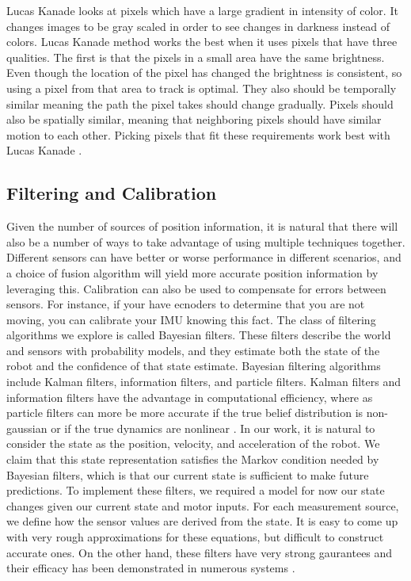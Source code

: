 \documentclass{article}
\begin{document}
	Lucas Kanade looks at pixels which have a large gradient in intensity of color. It changes images to be gray scaled in order to see changes in darkness instead of colors. Lucas Kanade method works the best when it uses pixels that have three qualities. The first is that the pixels in a small area have the same brightness. Even though the location of the pixel has changed the brightness is consistent, so using a pixel from that area to track is optimal. They also should be temporally similar meaning the path the pixel takes should change gradually. Pixels should also be spatially similar, meaning that neighboring pixels should have similar motion to each other. Picking pixels that fit these requirements work best with Lucas Kanade \cite{sun_optical_2008}.

  \subsection{Filtering and Calibration} \label{filtering}

  Given the number of sources of position information, it is natural that there will also be a number of ways to take advantage of using multiple techniques together. Different sensors can have better or worse performance in different scenarios, and a choice of fusion algorithm will yield more accurate position information by leveraging this. Calibration can also be used to compensate for errors between sensors. For instance, if your have ecnoders to determine that you are not moving, you can calibrate your IMU knowing this fact. The class of filtering algorithms we explore is called Bayesian filters. These filters describe the world and sensors with probability models, and they estimate both the state of the robot and the confidence of that state estimate. Bayesian filtering algorithms include Kalman filters, information filters, and particle filters. Kalman filters and information filters have the advantage in computational efficiency, where as particle filters can more be more accurate if the true belief distribution is non-gaussian or if the true dynamics are nonlinear \cite{thrun_probabilistic_2005}. In our work, it is natural to consider the state as the position, velocity, and acceleration of the robot. We claim that this state representation satisfies the Markov condition needed by Bayesian filters, which is that our current state is sufficient to make future predictions. To implement these filters, we required a model for now our state changes given our current state and motor inputs. For each measurement source, we define how the sensor values are derived from the state. It is easy to come up with very rough approximations for these equations, but difficult to construct accurate ones. On the other hand, these filters have very strong gaurantees and their efficacy has been demonstrated in numerous systems \cite{chui_kalman_1991}\cite{digiampaolo_mobile_2014}\cite{mirzaei_kalman_2008}\cite{nasa_kalman_1999}\cite{saab_standalone_2011}.
\end{document}
